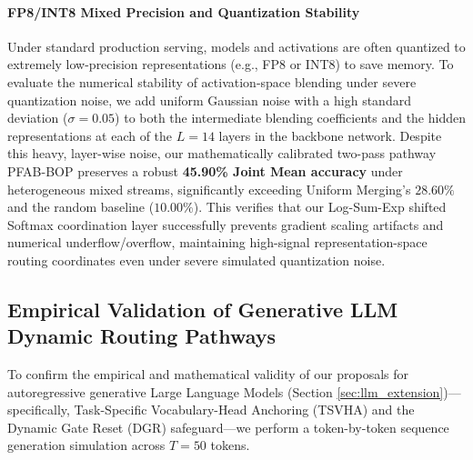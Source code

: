 \paragraph{FP8/INT8 Mixed Precision and Quantization Stability}
Under standard production serving, models and activations are often quantized to extremely low-precision representations (e.g., FP8 or INT8) to save memory. To evaluate the numerical stability of activation-space blending under severe quantization noise, we add uniform Gaussian noise with a high standard deviation ($\sigma = 0.05$) to both the intermediate blending coefficients and the hidden representations at each of the $L=14$ layers in the backbone network. Despite this heavy, layer-wise noise, our mathematically calibrated two-pass pathway \textsc{PFAB-BOP} preserves a robust \textbf{45.90\% Joint Mean accuracy} under heterogeneous mixed streams, significantly exceeding Uniform Merging's $28.60\%$ and the random baseline ($10.00\%$). This verifies that our Log-Sum-Exp shifted Softmax coordination layer successfully prevents gradient scaling artifacts and numerical underflow/overflow, maintaining high-signal representation-space routing coordinates even under severe simulated quantization noise.

\subsection{Empirical Validation of Generative LLM Dynamic Routing Pathways} \label{sec:lag_discussion}
To confirm the empirical and mathematical validity of our proposals for autoregressive generative Large Language Models (Section \ref{sec:llm_extension})—specifically, Task-Specific Vocabulary-Head Anchoring (TSVHA) and the Dynamic Gate Reset (DGR) safeguard—we perform a token-by-token sequence generation simulation across $T = 50$ tokens.

